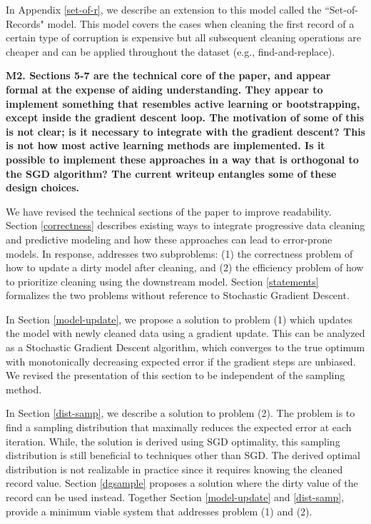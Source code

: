 \vspace{0.5em}

In Appendix \ref{set-of-r}, we describe an extension to this model called the ``Set-of-Records" model.
This model covers the cases when cleaning the first record of a certain type of corruption is expensive but all subsequent cleaning operations are cheaper and can be applied throughout the dataset (e.g., find-and-replace).

\vspace{0.5em}

\noindent\textbf{M2. Sections 5-7 are the technical core of the paper, and appear formal at the expense of aiding understanding. They appear to implement something that resembles active learning or bootstrapping, except inside the gradient descent loop. The motivation of some of this is not clear; is it necessary to integrate with the gradient descent? This is not how most active learning methods are implemented. Is it possible to implement these approaches in a way that is orthogonal to the SGD algorithm? The current writeup entangles some of these design choices.} 

We have revised the technical sections of the paper to improve readability.
Section \ref{correctness} describes existing ways to integrate progressive data cleaning and predictive modeling and how these approaches can lead to error-prone models.
In response, \sys addresses two subproblems: (1) the correctness problem of how to update a dirty model after cleaning, and (2) the efficiency problem of how to prioritize cleaning using the downstream model. 
Section \ref{statements} formalizes the two problems without reference to Stochastic Gradient Descent.

In Section \ref{model-update}, we propose a solution to problem (1) which updates the model with newly cleaned data using a gradient update.
This can be analyzed as a Stochastic Gradient Descent algorithm, which converges to the true optimum with monotonically decreasing expected error if the gradient steps are unbiased.
We revised the presentation of this section to be independent of the sampling method.

In Section \ref{dist-samp}, we describe a solution to problem (2).
The problem is to find a sampling distribution that maximally reduces the expected error
at each iteration.
While, the solution is derived using SGD optimality, this sampling distribution is still beneficial to techniques other than SGD.
The derived optimal distribution is not realizable in practice since it requires knowing the cleaned record value.
Section \ref{dgsample} proposes a solution where the dirty value of the record can be used instead.
Together Section \ref{model-update} and \ref{dist-samp}, provide a minimum viable system that addresses problem (1) and (2).


